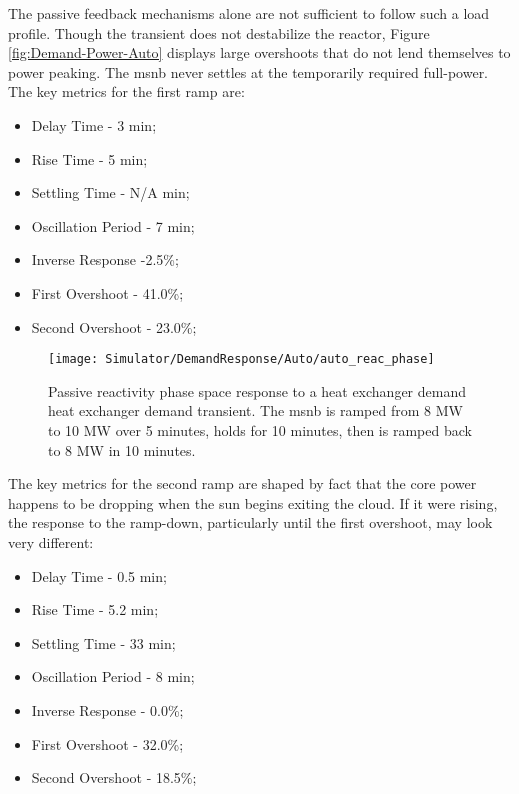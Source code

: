 The passive feedback mechanisms alone are not sufficient to follow such a load profile. Though the transient does not destabilize the reactor, Figure \ref{fig:Demand-Power-Auto} displays large overshoots that do not lend themselves to power peaking. The \acs{msnb} never settles at the temporarily required full-power. The key metrics for the first ramp are:

\begin{itemize}
    \item Delay Time - 3 min;
    \item Rise Time - 5 min;
    \item Settling Time - N/A min;
    \item Oscillation Period - 7 min;
    \item Inverse Response -2.5\%;
    \item First Overshoot - 41.0\%;
    \item Second Overshoot - 23.0\%;
\end{itemize}

\begin{figure}[ht!]
    \centering
    \texttt{[image: Simulator/DemandResponse/Auto/auto\_reac\_phase]}
    \caption[Autonomous Demand-Response Reactivity Phase Space]{Passive reactivity phase space response to a heat exchanger demand heat exchanger demand transient. The \acs{msnb} is ramped from 8 MW to 10 MW over 5 minutes, holds for 10 minutes, then is ramped back to 8 MW in 10 minutes.}
    \label{fig:Demand-PassivePhase-Auto}
\end{figure}

The key metrics for the second ramp are shaped by fact that the core power happens to be dropping when the sun begins exiting the cloud. If it were rising, the response to the ramp-down, particularly until the first overshoot, may look very different:

\begin{itemize}
    \item Delay Time - 0.5 min;
    \item Rise Time - 5.2 min;
    \item Settling Time - 33 min;
    \item Oscillation Period - 8 min;
    \item Inverse Response - 0.0\%;
    \item First Overshoot - 32.0\%;
    \item Second Overshoot - 18.5\%;
\end{itemize}

